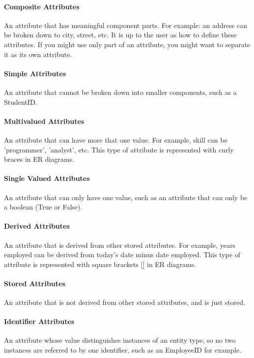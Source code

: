 \documentclass[12pt]{article}
\begin{document}
\paragraph{Composite Attributes} An attribute that has meaningful component parts. For example: an address can be broken down to city, street, etc. It is up to the user as how to define these attributes. If you might use only part of an attribute, you might want to separate it as its own attribute.

\paragraph{Simple Attributes} An attribute that cannot be broken down into smaller components, such as a StudentID.

\paragraph{Multivalued Attributes} An attribute that can have more that one value. For example, skill can be 'programmer', 'analyst', etc. This type of attribute is represented with curly braces {} in ER diagrams.

\paragraph{Single Valued Attributes} An attribute that can only have one value, such as an attribute that can only be a boolean (True or False).

\paragraph{Derived Attributes} An attribute that is derived from other stored attributes. For example, years employed can be derived from today's date minus date employed. This type of attribute is represented with square brackets [] in ER diagrams.

\paragraph{Stored Attributes} An attribute that is not derived from other stored attributes, and is just stored.

\paragraph{Identifier Attributes} An attribute whose value distinguishes instances of an entity type, so no two instances are referred to by one identifier, such as an EmployeeID for example.
\end{document}
